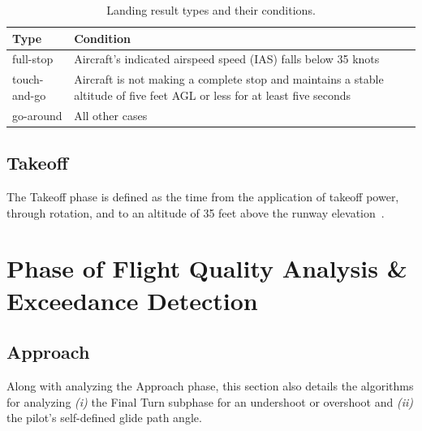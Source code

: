     \begin{table}
        \caption{Landing result types and their conditions.}
        \label{tab:landing_types}
        \centering
        \begin{tabular}{@{} >{\centering\arraybackslash} m{.20\linewidth} m{.70\linewidth} @{}}
            \hline
            \bfseries Type & \bfseries Condition \\ \hline
            full-stop    & Aircraft's indicated airspeed speed (IAS) falls below 35 knots \\ \hline
            touch-and-go & Aircraft is not making a complete stop and maintains a stable altitude of five feet AGL or less for at least five seconds \\ \hline
            go-around    & All other cases \\ \hline
        \end{tabular}
    \end{table}
    
    
    \subsection{Takeoff}
    
    The Takeoff phase is defined as the time from the application of takeoff power, through rotation, and to an altitude of 35 feet above the runway elevation~\cite{cictt2013phase}.
    

\section{Phase of Flight Quality Analysis \& Exceedance Detection} \label{sec:phase_quality}
    
	\subsection{Approach}
        
        Along with analyzing the Approach phase, this section also details the algorithms for analyzing \textit{(i)} the Final Turn subphase for an undershoot or overshoot and \textit{(ii)} the pilot's self-defined glide path angle.
        
